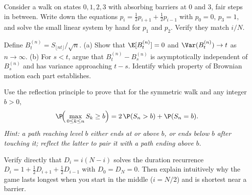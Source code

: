 \begin{exercise}
\label{ch26:ex-firststep}
Consider a walk on states $0, 1, 2, 3$ with absorbing barriers at $0$ and $3$,
fair steps in between. Write down the equations $p_i = \tfrac12 p_{i+1} +
\tfrac12 p_{i-1}$ with $p_0 = 0$, $p_3 = 1$, and solve the small linear system
by hand for $p_1$ and $p_2$. Verify they match $i/N$.
\end{exercise}

\begin{exercise}
\label{ch26:ex-scaling}
Define $B_t^{(n)} = S_{\lfloor nt \rfloor}/\sqrt{n}$. (a) Show that
$\E[B_t^{(n)}] = 0$ and $\Var(B_t^{(n)}) \to t$ as $n \to \infty$. (b) For
$s < t$, argue that $B_t^{(n)} - B_s^{(n)}$ is asymptotically independent of
$B_s^{(n)}$ and has variance approaching $t - s$. Identify which property of
Brownian motion each part establishes.
\end{exercise}

\begin{exercise}
\label{ch26:ex-maxproof}
Use the reflection principle to prove that for the symmetric walk and any
integer $b > 0$,
\[
  \P\!\Big(\max_{0 \le k \le n} S_k \ge b\Big)
  = 2\,\P(S_n > b) + \P(S_n = b).
\]
\emph{Hint: a path reaching level $b$ either ends at or above $b$, or ends
below $b$ after touching it; reflect the latter to pair it with a path ending
above $b$.}
\end{exercise}

\begin{exercise}
\label{ch26:ex-durparabola}
Verify directly that $D_i = i(N - i)$ solves the duration recurrence
$D_i = 1 + \tfrac12 D_{i+1} + \tfrac12 D_{i-1}$ with $D_0 = D_N = 0$. Then
explain intuitively why the game lasts longest when you start in the middle
($i = N/2$) and is shortest near a barrier.
\end{exercise}
